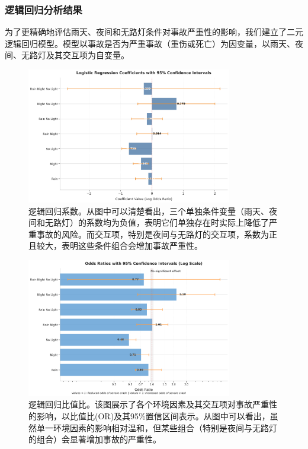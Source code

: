 \documentclass[12pt,a4paper]{article}
\begin{document}
\subsubsection{逻辑回归分析结果}

为了更精确地评估雨天、夜间和无路灯条件对事故严重性的影响，我们建立了二元逻辑回归模型。模型以事故是否为严重事故（重伤或死亡）为因变量，以雨天、夜间、无路灯及其交互项为自变量。

\begin{figure}[H]
\centering
\includegraphics[width=0.8\textwidth]{logistic_regression_coefficients.png}
\caption{逻辑回归系数。从图中可以清楚看出，三个单独条件变量（雨天、夜间和无路灯）的系数均为负值，表明它们单独存在时实际上降低了严重事故的风险。而交互项，特别是夜间与无路灯的交互项，系数为正且较大，表明这些条件组合会增加事故严重性。}
\label{fig:logistic_regression_coefficients}
\end{figure}

\begin{figure}[H]
\centering
\includegraphics[width=0.8\textwidth]{logistic_regression_odds_ratios.png}
\caption{逻辑回归比值比。该图展示了各个环境因素及其交互项对事故严重性的影响，以比值比(OR)及其95\%置信区间表示。从图中可以看出，虽然单一环境因素的影响相对温和，但某些组合（特别是夜间与无路灯的组合）会显著增加事故的严重性。}
\label{fig:logistic_regression_odds_ratios}
\end{figure}
\end{document}
